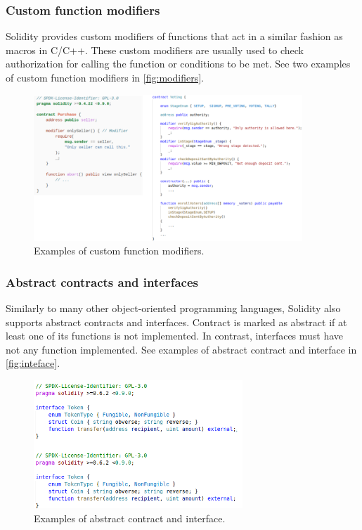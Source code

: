 \subsubsection{Custom function modifiers}\label{sec:modifiers}
Solidity provides custom modifiers of functions that act in a similar fashion as macros in C/C++.
These custom modifiers are usually used to check authorization for calling the function or conditions to be met.
See two examples of custom function modifiers in \autoref{fig:modifiers}.

\begin{figure}[t]
	\begin{center}
		\includegraphics[width=0.9\textwidth]{./figs/modifiers-custom.png}
		\caption{Examples of custom function modifiers.}		
		\label{fig:modifiers}
	\end{center}	
\end{figure}

\subsubsection{Abstract contracts and interfaces}\label{sec:interfaces}
Similarly to  many other object-oriented programming languages, Solidity also supports abstract contracts and interfaces.
Contract is marked as abstract if at least one of its functions is not implemented. In contrast, interfaces must have not any function implemented.
See examples of abstract contract and interface in \autoref{fig:inteface}. 

\begin{figure}[bt]
	\begin{center}
		\includegraphics[width=0.7\textwidth]{./figs/abstract-contract.png }
		\caption{Examples of abstract contract and interface.}		
		\label{fig:inteface}
	\end{center}	
\end{figure}



